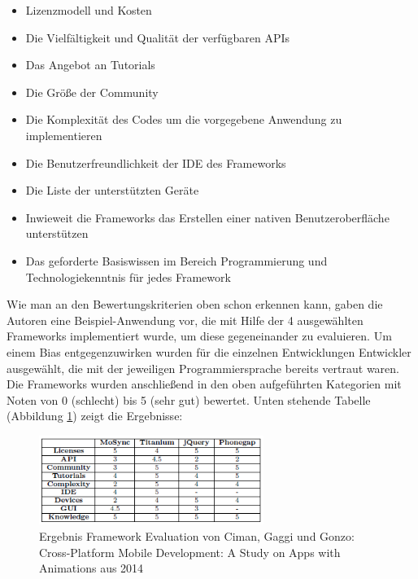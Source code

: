\begin{itemize}
\item Lizenzmodell und Kosten
\item Die Vielfältigkeit und Qualität der verfügbaren APIs
\item Das Angebot an Tutorials
\item Die Größe der Community
\item Die Komplexität des Codes um die vorgegebene Anwendung zu implementieren
\item Die Benutzerfreundlichkeit der IDE des Frameworks
\item Die Liste der unterstützten Geräte
\item Inwieweit die Frameworks das Erstellen einer nativen Benutzeroberfläche unterstützen 
\item Das geforderte Basiswissen im Bereich Programmierung und Technologiekenntnis für jedes Framework
\end{itemize}

Wie man an den Bewertungskriterien oben schon erkennen kann, gaben die Autoren eine Beispiel-Anwendung vor, die mit Hilfe der 4 ausgewählten Frameworks implementiert wurde, um diese gegeneinander zu evaluieren. Um einem Bias entgegenzuwirken wurden für die einzelnen Entwicklungen Entwickler ausgewählt, die mit der jeweiligen Programmiersprache bereits vertraut waren. Die Frameworks wurden anschließend in den oben aufgeführten Kategorien mit Noten von 0 (schlecht) bis 5 (sehr gut) bewertet. Unten stehende Tabelle  (Abbildung \ref{fig:Ergebnis_Framework_Eval_Publ}) zeigt die Ergebnisse:
\clearpage

 \begin{figure}[h]
	\centering
	\includegraphics[width=0.65\textwidth]{Bilder/Ergebnis_Framework_Bewertung_Publ_2.PNG}
	\caption{Ergebnis Framework Evaluation von Ciman, Gaggi und Gonzo: Cross-Platform Mobile Development: A Study on Apps with Animations aus 2014}
	\label{fig:Ergebnis_Framework_Eval_Publ}
\end{figure}

